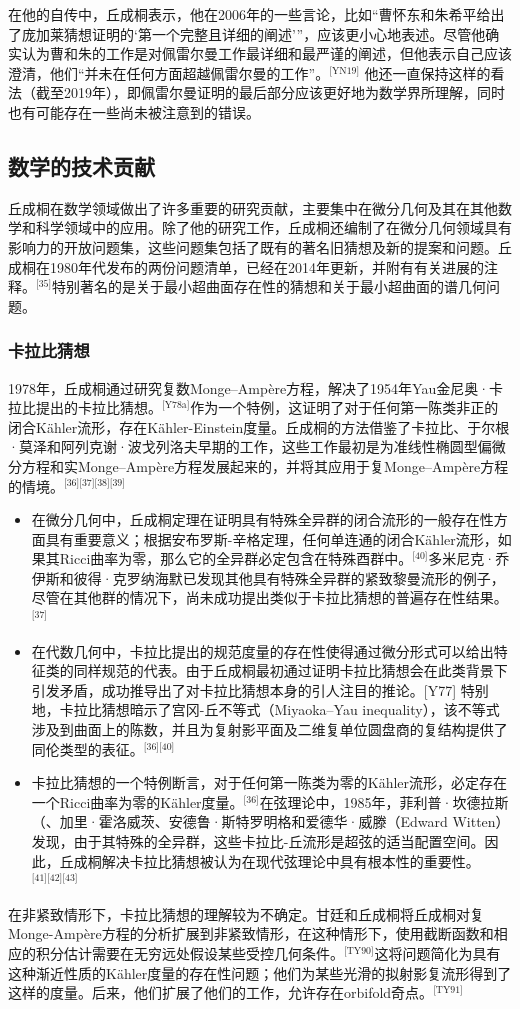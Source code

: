 在他的自传中，丘成桐表示，他在2006年的一些言论，比如“曹怀东和朱希平给出了庞加莱猜想证明的‘第一个完整且详细的阐述’”，应该更小心地表述。尽管他确实认为曹和朱的工作是对佩雷尔曼工作最详细和最严谨的阐述，但他表示自己应该澄清，他们“并未在任何方面超越佩雷尔曼的工作”。\(^\text{[YN19]}\) 他还一直保持这样的看法（截至2019年），即佩雷尔曼证明的最后部分应该更好地为数学界所理解，同时也有可能存在一些尚未被注意到的错误。
\subsection{数学的技术贡献}
丘成桐在数学领域做出了许多重要的研究贡献，主要集中在微分几何及其在其他数学和科学领域中的应用。除了他的研究工作，丘成桐还编制了在微分几何领域具有影响力的开放问题集，这些问题集包括了既有的著名旧猜想及新的提案和问题。丘成桐在1980年代发布的两份问题清单，已经在2014年更新，并附有有关进展的注释。\(^\text{[35]}\)特别著名的是关于最小超曲面存在性的猜想和关于最小超曲面的谱几何问题。
\subsubsection{卡拉比猜想}
1978年，丘成桐通过研究复数Monge–Ampère方程，解决了1954年Yau金尼奥·卡拉比提出的卡拉比猜想。\(^\text{[Y78a]}\)作为一个特例，这证明了对于任何第一陈类非正的闭合Kähler流形，存在Kähler-Einstein度量。丘成桐的方法借鉴了卡拉比、于尔根·莫泽和阿列克谢·波戈列洛夫早期的工作，这些工作最初是为准线性椭圆型偏微分方程和实Monge–Ampère方程发展起来的，并将其应用于复Monge–Ampère方程的情境。\(^\text{[36][37][38][39]}\)
\begin{itemize}
\item 在微分几何中，丘成桐定理在证明具有特殊全异群的闭合流形的一般存在性方面具有重要意义；根据安布罗斯-辛格定理，任何单连通的闭合Kähler流形，如果其Ricci曲率为零，那么它的全异群必定包含在特殊酉群中。\(^\text{[40]}\)多米尼克·乔伊斯和彼得·克罗纳海默已发现其他具有特殊全异群的紧致黎曼流形的例子，尽管在其他群的情况下，尚未成功提出类似于卡拉比猜想的普遍存在性结果。\(^\text{[37]}\)
\item 在代数几何中，卡拉比提出的规范度量的存在性使得通过微分形式可以给出特征类的同样规范的代表。由于丘成桐最初通过证明卡拉比猜想会在此类背景下引发矛盾，成功推导出了对卡拉比猜想本身的引人注目的推论。[Y77] 特别地，卡拉比猜想暗示了宫冈-丘不等式（Miyaoka–Yau inequality），该不等式涉及到曲面上的陈数，并且为复射影平面及二维复单位圆盘商的复结构提供了同伦类型的表征。\(^\text{[36][40]}\)  
\item 卡拉比猜想的一个特例断言，对于任何第一陈类为零的Kähler流形，必定存在一个Ricci曲率为零的Kähler度量。\(^\text{[36]}\)在弦理论中，1985年，菲利普·坎德拉斯（、加里·霍洛威茨、安德鲁·斯特罗明格和爱德华·威滕（Edward Witten）发现，由于其特殊的全异群，这些卡拉比-丘流形是超弦的适当配置空间。因此，丘成桐解决卡拉比猜想被认为在现代弦理论中具有根本性的重要性。\(^\text{[41][42][43]}\)
\end{itemize}
在非紧致情形下，卡拉比猜想的理解较为不确定。甘廷和丘成桐将丘成桐对复Monge-Ampère方程的分析扩展到非紧致情形，在这种情形下，使用截断函数和相应的积分估计需要在无穷远处假设某些受控几何条件。\(^\text{[TY90]}\)这将问题简化为具有这种渐近性质的Kähler度量的存在性问题；他们为某些光滑的拟射影复流形得到了这样的度量。后来，他们扩展了他们的工作，允许存在orbifold奇点。\(^\text{[TY91] }\) 

